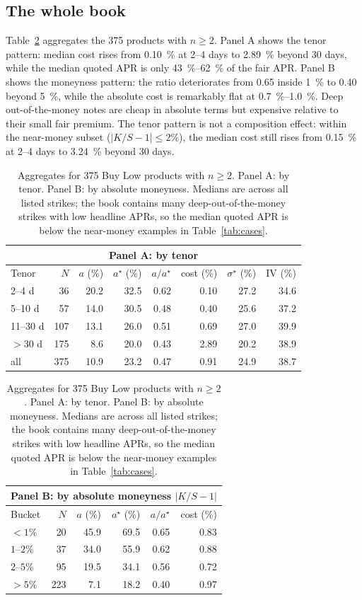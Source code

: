 \documentclass[11pt]{article}
\begin{document}
\subsection{The whole book}

Table~\ref{tab:aggregate} aggregates the 375 products with $n\ge2$. Panel A shows the tenor pattern: median cost rises from \SI{0.10}{\percent} at 2--4 days to \SI{2.89}{\percent} beyond 30 days, while the median quoted APR is only \SI{43}{\percent}--\SI{62}{\percent} of the fair APR. Panel B shows the moneyness pattern: the ratio deteriorates from \num{0.65} inside \SI{1}{\percent} to \num{0.40} beyond \SI{5}{\percent}, while the absolute cost is remarkably flat at \SI{0.7}{\percent}--\SI{1.0}{\percent}. Deep out-of-the-money notes are cheap in absolute terms but expensive relative to their small fair premium. The tenor pattern is not a composition effect: within the near-money subset ($|K/S-1|\le2\%$), the median cost still rises from \SI{0.15}{\percent} at 2--4 days to \SI{3.24}{\percent} beyond 30 days.

\begin{table}[t]
\centering
\caption{Aggregates for 375 Buy Low products with $n\ge2$. Panel A: by tenor. Panel B: by absolute moneyness. Medians are across all listed strikes; the book contains many deep-out-of-the-money strikes with low headline APRs, so the median quoted APR is below the near-money examples in Table~\ref{tab:cases}.}
\label{tab:aggregate}
\small
\begin{tabular}{lrrrrrrr}
\toprule
\multicolumn{8}{c}{\textbf{Panel A: by tenor}}\\
\midrule
Tenor & $N$ & $a$ (\%) & $a^\star$ (\%) & $a/a^\star$ & cost (\%) & $\sigma^\star$ (\%) & IV (\%)\\
\midrule
2--4 d & 36 & 20.2 & 32.5 & 0.62 & 0.10 & 27.2 & 34.6\\
5--10 d & 57 & 14.0 & 30.5 & 0.48 & 0.40 & 25.6 & 37.2\\
11--30 d & 107 & 13.1 & 26.0 & 0.51 & 0.69 & 27.0 & 39.9\\
$>$30 d & 175 & 8.6 & 20.0 & 0.43 & 2.89 & 20.2 & 38.9\\
all & 375 & 10.9 & 23.2 & 0.47 & 0.91 & 24.9 & 38.7\\
\bottomrule
\end{tabular}

\vspace{8pt}
\begin{tabular}{lrrrrr}
\toprule
\multicolumn{6}{c}{\textbf{Panel B: by absolute moneyness $|K/S-1|$}}\\
\midrule
Bucket & $N$ & $a$ (\%) & $a^\star$ (\%) & $a/a^\star$ & cost (\%)\\
\midrule
$<1\%$ & 20 & 45.9 & 69.5 & 0.65 & 0.83\\
$1$--$2\%$ & 37 & 34.0 & 55.9 & 0.62 & 0.88\\
$2$--$5\%$ & 95 & 19.5 & 34.1 & 0.56 & 0.72\\
$>5\%$ & 223 & 7.1 & 18.2 & 0.40 & 0.97\\
\bottomrule
\end{tabular}
\end{table}
\end{document}
